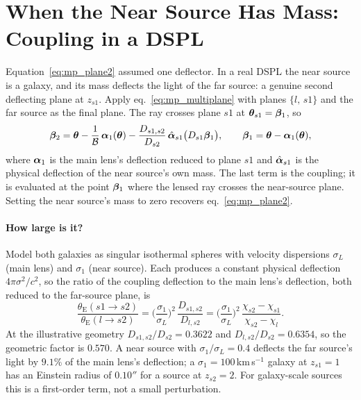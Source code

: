 \section{When the Near Source Has Mass: Coupling in a DSPL}
\label{sec:mp_coupling}

Equation~\eqref{eq:mp_plane2} assumed one deflector.  In a real DSPL the
near source is a galaxy, and its mass deflects the light of the far
source: a genuine second deflecting plane at $z_{s1}$.  Apply
eq.~\eqref{eq:mp_multiplane} with planes $\{l,\,s1\}$ and the far source
as the final plane.  The ray crosses plane $s1$ at
$\boldsymbol{\theta}_{s1}=\boldsymbol{\beta}_1$, so
\begin{equation}
  \boldsymbol{\beta}_2 = \boldsymbol{\theta} - \frac{1}{\mathcal{B}}\,\boldsymbol{\alpha}_1(\boldsymbol{\theta})
             - \frac{D_{s1,s2}}{D_{s2}}\,\hat{\boldsymbol{\alpha}}_{s1}\big(D_{s1}\boldsymbol{\beta}_1\big),
  \qquad \boldsymbol{\beta}_1 = \boldsymbol{\theta} - \boldsymbol{\alpha}_1(\boldsymbol{\theta}),
  \label{eq:mp_coupling}
\end{equation}
where $\boldsymbol{\alpha}_1$ is the main lens's deflection reduced to plane
$s1$ and $\hat{\boldsymbol{\alpha}}_{s1}$ is the physical deflection of the near
source's own mass.  The last term is the coupling; it is evaluated at
the point $\boldsymbol{\beta}_1$ where the lensed ray crosses the
near-source plane.  Setting the near source's mass to zero recovers
eq.~\eqref{eq:mp_plane2}.  

\paragraph{How large is it?}  Model both galaxies as singular isothermal
spheres with velocity dispersions $\sigma_L$ (main lens) and $\sigma_1$
(near source).  Each produces a constant physical deflection
$4\pi\sigma^2/c^2$, so the ratio of the coupling deflection to the main
lens's deflection, both reduced to the far-source plane, is
\begin{equation}
  \frac{\theta_{\mathrm{E}}(s1\to s2)}{\theta_{\mathrm{E}}(l\to s2)}
  = \Big(\frac{\sigma_1}{\sigma_L}\Big)^{2}\,\frac{D_{s1,s2}}{D_{l,s2}}
  = \Big(\frac{\sigma_1}{\sigma_L}\Big)^{2}\,
    \frac{\chi_{s2}-\chi_{s1}}{\chi_{s2}-\chi_l} .
  \label{eq:mp_couplingsize}
\end{equation}
At the illustrative geometry $D_{s1,s2}/D_{s2}=0.3622$ and
$D_{l,s2}/D_{s2}=0.6354$, so the geometric factor is $0.570$.  A near
source with $\sigma_1/\sigma_L=0.4$ deflects the far source's light by
$9.1\%$ of the main lens's deflection; a $\sigma_1=100$\,km\,s$^{-1}$
galaxy at $z_{s1}=1$ has an Einstein radius of $0.10''$ for a source at
$z_{s2}=2$.    For galaxy-scale sources this is a
first-order term, not a small perturbation.

